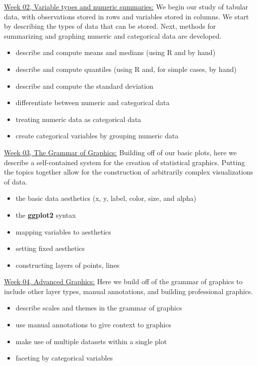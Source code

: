 \documentclass[12pt]{article}
\begin{document}
\bigskip

\underline{Week 02, Variable types and numeric summaries:}
We begin our study of tabular data, with observations stored in rows and
variables stored in columns. We start by describing the types of
data that can be stored. Next, methods for summarizing and graphing
numeric and categorical data are developed.
\begin{itemize}\setlength\itemsep{0em}
\item
  describe and compute means and medians (using R and by hand)
\item
  describe and compute quantiles (using R and, for simple cases, by
  hand)
\item
  describe and compute the standard deviation
\item
  differentiate between numeric and categorical data
\item
  treating numeric data as categorical data
\item
  create categorical variables by grouping numeric data
\end{itemize}

\bigskip

\underline{Week 03, The Grammar of Graphics:}
Building off of our basic plots, here we describe a self-contained
system for the creation of statistical graphics. Putting the topics
together allow for the construction of arbitrarily complex
visualizations of data.
\begin{itemize}\setlength\itemsep{0em}
\item
  the basic data aesthetics (x, y, label, color, size, and alpha)
\item
  the \textbf{ggplot2} syntax
\item
  mapping variables to aesthetics
\item
  setting fixed aesthetics
\item
  constructing layers of points, lines
\end{itemize}

\bigskip

\underline{Week 04, Advanced Graphics:}
Here we build off of the grammar of graphics to include
other layer types, manual annotations, and building
professional graphics.
\begin{itemize}\setlength\itemsep{0em}
\item
  describe scales and themes in the grammar of graphics
\item
  use manual annotations to give context to graphics
\item
  make use of multiple datasets within a single plot
\item
  faceting by categorical variables
\end{itemize}
\end{document}
